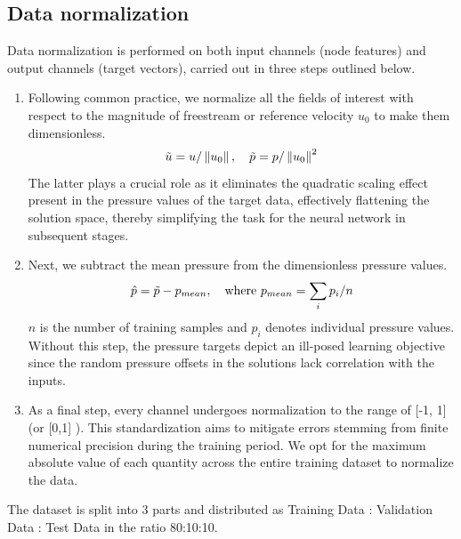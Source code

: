 \subsection{Data normalization}
Data normalization is performed on both input channels (node features) and output channels (target vectors), carried out in three steps outlined below.
\begin{enumerate}
\item Following common practice, we normalize all the fields of interest with respect to the magnitude of freestream or reference velocity $u_0$ to make them dimensionless. 
\begin{equation}
    \Tilde{u}=u /\left\|u_0\right\|, \quad \Tilde{p}=p /\left\|u_0\right\|^2
\end{equation}
The latter plays a crucial role as it eliminates the quadratic scaling effect present in the pressure values of the target data, effectively flattening the solution space, thereby simplifying the task for the neural network in subsequent stages.
\item Next, we subtract the mean pressure from the dimensionless pressure values. 
\begin{equation}
\hat{p} = \Tilde{p} - p_{mean} , \quad \text{where } p_{mean} = \sum_i p_i / n
\end{equation}
$n$ is the number of training samples and $p_i$ denotes individual pressure values. Without this step, the pressure targets depict an ill-posed learning objective since the random pressure offsets in the solutions lack correlation with the inputs.
\item As a final step, every channel undergoes normalization to the range of [-1, 1] (or [0,1] ). This standardization aims to mitigate errors stemming from finite numerical precision during the training period. We opt for the maximum absolute value of each quantity across the entire training dataset to normalize the data. 
\end{enumerate}
The dataset is split into 3 parts and distributed as Training Data : Validation Data : Test Data in the ratio 80:10:10. 
